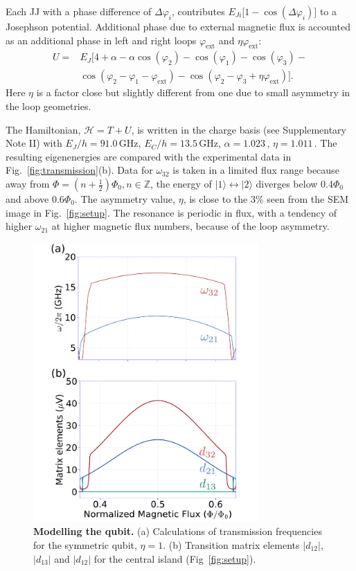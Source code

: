 \documentclass[%
reprint,
superscriptaddress,
bibnotes,
amsmath,
amssymb,
aps,
showkeys,
prb,
]{revtex4-1}
\newcommand{\iunit}[2]{\ensuremath{#1\,\text{#2}}}
\begin{document}
{Each  JJ  with  a  phase  difference  of  $\Delta\varphi_{i}$,  contributes $ E_{Ji}\big[1 - \cos(\Delta\varphi_i)\big] $ to a Josephson potential.   Additional phase due to external magnetic flux is accounted as an additional phase in left and right loops
$ \varphi_\text{ext} $ and $ \eta\varphi_\text{ext} $:
\begin{equation}\label{eq:kinetic}
  \begin{aligned}
    U  = &E_J\big[4 + \alpha - \alpha\cos(\varphi_{2}) -\cos(\varphi_{1}) -\cos(\varphi_{3}) - \\
    & \cos(\varphi_{2}   -  \varphi_{1}  -  \varphi_{\text{ext}})  -  \cos(\varphi_{2}   -  \varphi_{3}  +
    \eta\varphi_{\text{ext}})\big].
  \end{aligned}
\end{equation}
Here $\eta$ is a factor close but slightly different from one due to small asymmetry in the loop geometries.

The  Hamiltonian, $\mathcal{H}= T + U$, is  written  in  the charge  basis (see Supplementary Note II)  with
\iunit{E_J/h = 91.0}{GHz}, \iunit{E_C/h = 13.5}{GHz}, \iunit{\alpha = 1.023}{}, \iunit{\eta
  = 1.011}{}. The resulting eigenenergies are compared with the experimental data in
Fig.~\ref{fig:transmission}(b).  Data for $ \omega_{32} $ is taken in a limited flux range
because away from $ \Phi = (n + \frac{1}{2}) \Phi_0, n\in\mathbb{Z} $, the energy of $|1\rangle \leftrightarrow |2\rangle$ diverges below 0.4$\Phi_0$ and above 0.6$\Phi_0$.  The  asymmetry value, $ \eta $,  is close to
the  3\%  seen  from  the   SEM  image  in
Fig.~\ref{fig:setup}.  The  resonance is  periodic in flux,  with a  tendency of
higher $\omega_{21}$ at higher magnetic flux numbers, because of the loop asymmetry.

\begin{figure}
  \includegraphics[width=86mm]{fig3}
  \caption{\small \textbf{Modelling the qubit.}
    (a) Calculations of transmission frequencies for the symmetric qubit,
    $\eta=1$. (b) Transition matrix elements $|d_{12}|$, $|d_{13}|$ and $|d_{12}|$ for the central island (Fig~\ref{fig:setup}).
  \label{fig:simulations}}
\end{figure}

}
\end{document}
